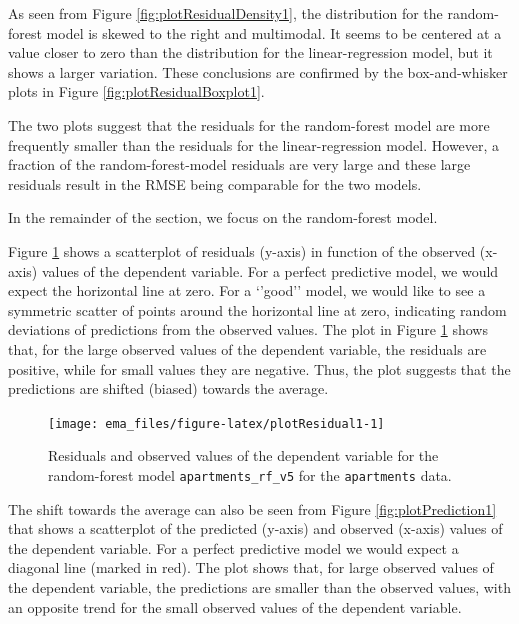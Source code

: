 \documentclass[]{krantz}
\begin{document}
As seen from Figure \ref{fig:plotResidualDensity1}, the distribution for the random-forest model is skewed to the right and multimodal. It seems to be centered at a value closer to zero than the distribution for the linear-regression model, but it shows a larger variation. These conclusions are confirmed by the box-and-whisker plots in Figure \ref{fig:plotResidualBoxplot1}.

The two plots suggest that the residuals for the random-forest model are more frequently smaller than the residuals for the linear-regression model. However, a fraction of the random-forest-model residuals are very large and these large residuals result in the RMSE being comparable for the two models.

In the remainder of the section, we focus on the random-forest model.

Figure \ref{fig:plotResidual1} shows a scatterplot of residuals (y-axis) in function of the observed (x-axis) values of the dependent variable. For a perfect predictive model, we would expect the horizontal line at zero. For a `'good'' model, we would like to see a symmetric scatter of points around the horizontal line at zero, indicating random deviations of predictions from the observed values. The plot in Figure \ref{fig:plotResidual1} shows that, for the large observed values of the dependent variable, the residuals are positive, while for small values they are negative. Thus, the plot suggests that the predictions are shifted (biased) towards the average.



\begin{figure}

{\centering \texttt{[image: ema\_files/figure-latex/plotResidual1-1]} 

}

\caption{Residuals and observed values of the dependent variable for the random-forest model \texttt{apartments\_rf\_v5} for the \texttt{apartments} data.}\label{fig:plotResidual1}
\end{figure}

The shift towards the average can also be seen from Figure \ref{fig:plotPrediction1} that shows a scatterplot of the predicted (y-axis) and observed (x-axis) values of the dependent variable. For a perfect predictive model we would expect a diagonal line (marked in red). The plot shows that, for large observed values of the dependent variable, the predictions are smaller than the observed values, with an opposite trend for the small observed values of the dependent variable.
\end{document}
